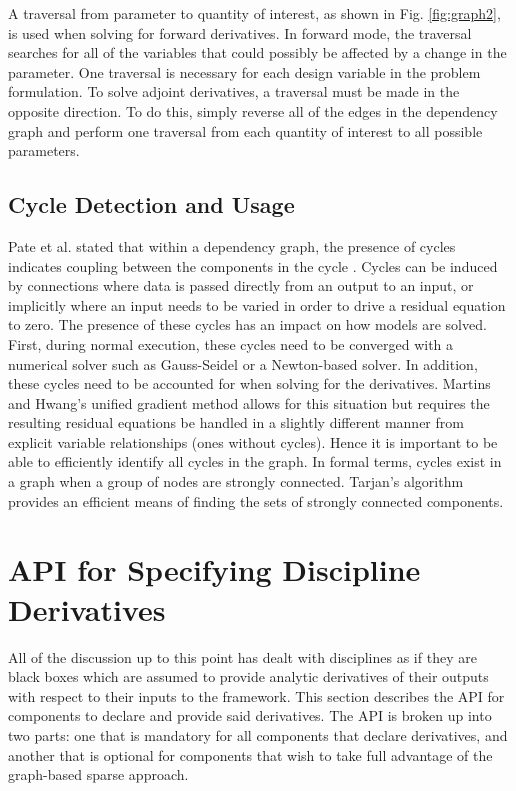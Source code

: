 \documentclass[]{aiaa-tc} %
\begin{document}
        A traversal from parameter to quantity of interest, as shown in Fig. \ref{fig:graph2}, is used when solving for 
        forward derivatives. In forward mode, the traversal searches for all of the variables that could possibly 
        be affected by a change in the parameter. One traversal is necessary for each design variable in the 
        problem formulation. To solve adjoint derivatives, a traversal must be made in 
        the opposite direction. To do this, simply reverse all of the edges in the dependency graph and 
        perform one traversal from each quantity of interest to all possible parameters. 
        


    \subsection{Cycle Detection and Usage}
        Pate et al. stated that within a dependency graph, the presence of cycles indicates coupling between
        the components in the cycle \cite{graph_problem2013}. Cycles can be induced by connections
        where data is passed directly from an output to an input, or implicitly where an input needs to
        be varied in order to drive a residual equation to zero. The presence of these cycles has 
        an impact on how models are solved. First, during normal execution, these cycles 
        need to be converged with a numerical solver such as Gauss-Seidel or a Newton-based solver.
        In addition, these cycles need to be accounted for when solving for the derivatives. Martins and Hwang's 
        unified gradient method allows for this situation but requires the resulting residual equations be
        handled in a slightly different manner from explicit variable relationships (ones without cycles). Hence 
        it is important to be able to efficiently identify all cycles in the graph. In formal terms, 
        cycles exist in a graph when a group of nodes are strongly connected. Tarjan's algorithm provides 
        an efficient means of finding the sets of strongly connected components\cite{tarjan1972depth,nuutila1994finding}. 


    \section{API for Specifying Discipline Derivatives}

        All of the discussion up to this point has dealt with disciplines as if they are black boxes
        which are assumed to provide analytic derivatives of their outputs with respect to their inputs
        to the framework. This section describes the API for components to declare and provide
        said derivatives. The API is broken up into two parts: one that is mandatory for all components
        that declare derivatives, and another that is optional for components that wish to take full
        advantage of the graph-based sparse approach.
\end{document}
